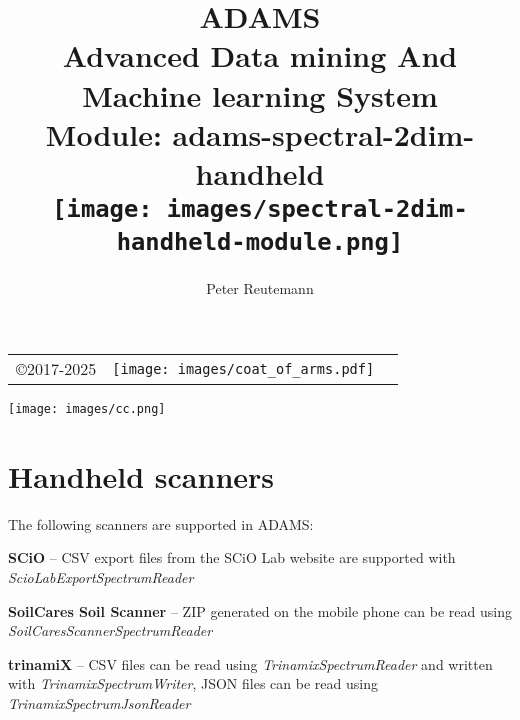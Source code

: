 \documentclass[a4paper]{book}
\title{
  \textbf{ADAMS} \\
  {\Large \textbf{A}dvanced \textbf{D}ata mining \textbf{A}nd \textbf{M}achine
  learning \textbf{S}ystem} \\
  {\Large Module: adams-spectral-2dim-handheld} \\
  \vspace{1cm}
  \texttt{[image: images/spectral-2dim-handheld-module.png]} \\
}
\author{
  Peter Reutemann
}
\begin{document}
\begin{titlepage}
\maketitle

\thispagestyle{empty}
\center
\begin{table}[b]
	\begin{tabular}{c l l}
		\parbox[c][2cm]{2cm}{\copyright 2017-2025} &
		\parbox[c][2cm]{5cm}{\texttt{[image: images/coat\_of\_arms.pdf]}} \\
	\end{tabular}
	\texttt{[image: images/cc.png]} \\
\end{table}

\end{titlepage}

\tableofcontents

\chapter{Handheld scanners}
The following scanners are supported in ADAMS:
\begin{tight_itemize}
  \item \textbf{SCiO}\cite{scio} -- CSV export files from the SCiO Lab website
  are supported with \textit{ScioLabExportSpectrumReader}
  \item \textbf{SoilCares Soil Scanner}\cite{soilcaressoil} -- ZIP generated on
  the mobile phone can be read using \textit{SoilCaresScannerSpectrumReader}
  \item \textbf{trinamiX}\cite{trinamix} -- CSV files can be read using
  \textit{TrinamixSpectrumReader} and written with \textit{TrinamixSpectrumWriter},
  JSON files can be read using \textit{TrinamixSpectrumJsonReader}

\end{tight_itemize}



\end{document}
